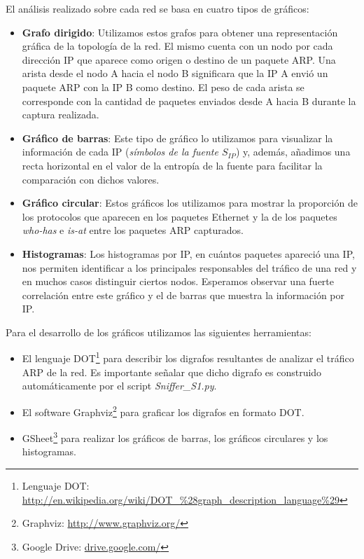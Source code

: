 El análisis realizado sobre cada red se basa en cuatro tipos de gráficos:
\begin{itemize}
	\item \textbf{Grafo dirigido}: Utilizamos estos grafos para obtener una representación gráfica de la topología de la red. El mismo cuenta con un nodo por cada dirección IP que aparece como origen o destino de un paquete ARP. Una arista desde el nodo A hacia el nodo B significara que la IP A envió un paquete ARP con la IP B como destino. El peso de cada arista se corresponde con la cantidad de paquetes enviados desde A hacia B durante la captura realizada.
  \item \textbf{Gráfico de barras}: Este tipo de gráfico lo utilizamos para visualizar la información de cada IP (\textit{símbolos de la fuente $S_{IP}$}) y, además, añadimos una recta horizontal en el valor de la entropía de la fuente para facilitar la comparación con dichos valores.
	\item \textbf{Gráfico circular}: Estos gráficos los utilizamos para mostrar la proporción de los protocolos que aparecen en los paquetes Ethernet y la de los paquetes \textit{who-has} e \textit{is-at} entre los paquetes ARP capturados.
	\item \textbf{Histogramas}: Los histogramas por IP, en cuántos paquetes apareció una IP, nos permiten identificar a los principales responsables del tráfico de una red y en muchos casos distinguir ciertos nodos. Esperamos observar una fuerte correlación entre este gráfico y el de barras que muestra la información por IP.
\end{itemize}

Para el desarrollo de los gráficos utilizamos las siguientes herramientas:
\begin{itemize}
	\item El lenguaje DOT\footnote{Lenguaje DOT: \url{http://en.wikipedia.org/wiki/DOT\_\%28graph_description_language\%29}} para describir los digrafos resultantes de analizar el tráfico ARP de la red. Es importante señalar que dicho digrafo es construido automáticamente por el script \textit{Sniffer\_S1.py}.
	\item El software Graphviz\footnote{Graphviz: \url{http://www.graphviz.org/}} para graficar los digrafos en formato DOT.
	\item GSheet\footnote{Google Drive: \url{drive.google.com/}} para realizar los gráficos de barras, los gráficos circulares y los histogramas.
\end{itemize}

\newpage